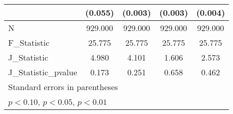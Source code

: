 {\begin{tabular}{l*{4}{c}}
            &     (0.055)         &     (0.003)         &     (0.003)         &     (0.004)         \\
\hline
N           &     929.000         &     929.000         &     929.000         &     929.000         \\
F\_Statistic &      25.775         &      25.775         &      25.775         &      25.775         \\
J\_Statistic &       4.980         &       4.101         &       1.606         &       2.573         \\
J\_Statistic\_pvalue&       0.173         &       0.251         &       0.658         &       0.462         \\
\hline\hline
\multicolumn{5}{l}{\footnotesize Standard errors in parentheses}\\
\multicolumn{5}{l}{\footnotesize \sym{*} \(p<0.10\), \sym{**} \(p<0.05\), \sym{***} \(p<0.01\)}\\
\end{tabular}
}
